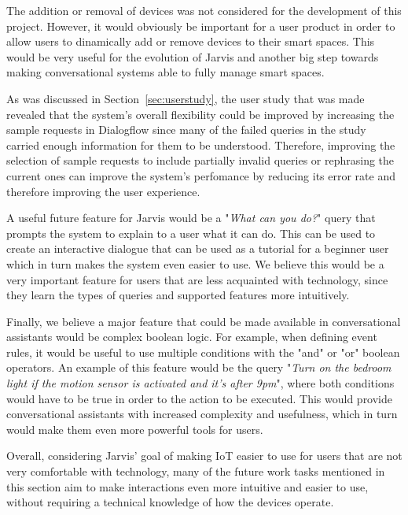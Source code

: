 \documentclass[runningheads]{llncs}
\begin{document}
The addition or removal of devices was not considered for the development of this project. However, it would obviously be important for a user product in order to allow users to dinamically add or remove devices to their smart spaces. This would be very useful for the evolution of Jarvis and another big step towards making conversational systems able to fully manage smart spaces.

As was discussed in Section~\ref{sec:userstudy}, the user study that was made revealed that the system's overall flexibility could be improved by increasing the sample requests in Dialogflow since many of the failed queries in the study carried enough information for them to be understood. Therefore, improving the selection of sample requests to include partially invalid queries or rephrasing the current ones can improve the system's perfomance by reducing its error rate and therefore improving the user experience.

A useful future feature for Jarvis would be a "\textit{What can you do?}" query that prompts the system to explain to a user what it can do. This can be used to create an interactive dialogue that can be used as a tutorial for a beginner user which in turn makes the system even easier to use. We believe this would be a very important feature for users that are less acquainted with technology, since they learn the types of queries and supported features more intuitively.

Finally, we believe a major feature that could be made available in conversational assistants would be complex boolean logic. For example, when defining event rules, it would be useful to use multiple conditions with the "and" or "or" boolean operators. An example of this feature would be the query "\textit{Turn on the bedroom light if the motion sensor is activated and it's after 9pm}", where both conditions would have to be true in order to the action to be executed. This would provide conversational assistants with increased complexity and usefulness, which in turn would make them even more powerful tools for users.

Overall, considering Jarvis' goal of making IoT easier to use for users that are not very comfortable with technology, many of the future work tasks mentioned in this section aim to make interactions even more intuitive and easier to use, without requiring a technical knowledge of how the devices operate.

\nocite{Rasch2014, VanderMeulen2017, bureaustatistics, Suresh2014, Chen2014, randall2003living, maruti, olgadavydova, joebirch}
\end{document}
